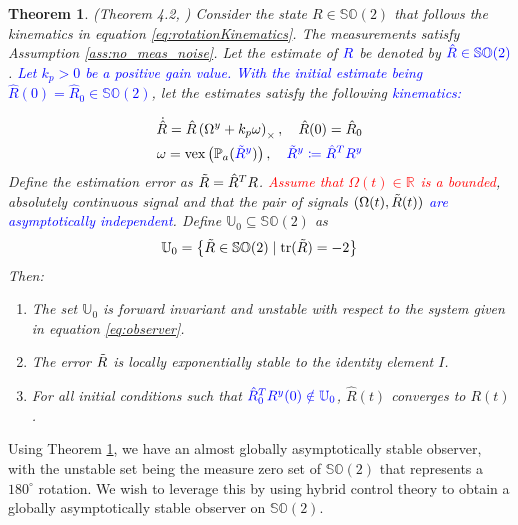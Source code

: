 \documentclass{article}
\newcommand{\SOtwo}{\mathbb{SO}(2)}
\newcommand{\R}[1]{\mathbb{R}^{#1}}
\newcommand{\Omegay}{\Omega^y}
\newcommand{\vex}[1]{\text{vex}\left(#1\right)}
\newtheorem{theorem}{Theorem}
\newcommand{\textblue}[1]{\textcolor{blue}{#1}}
\begin{document}
\begin{theorem} \label{thm:mahony}
(Theorem 4.2, \cite{mahony_complementaryFilter}) Consider the state $R\in\SOtwo$ that follows the kinematics in equation \eqref{eq:rotationKinematics}. The measurements satisfy Assumption \eqref{ass:no_meas_noise}. Let the estimate of $\textcolor{blue}{R}$ be denoted by $\textcolor{blue}{\hat{R}\in\SOtwo}$. \textcolor{blue}{Let $k_p > 0$ be a positive gain value. With the initial estimate being $\hat{R}(0) = \hat{R}_0 \in \SOtwo$}, let the estimates satisfy the following \textcolor{blue}{kinematics:}

\begin{subequations}\label{eq:observer}
\begin{align}
    \dot{\hat{R}} = \hat{R}\left( \Omegay + k_p\omega\right)_\times, \quad \hat{R}(0) = \hat{R}_0 \label{eq:}\\
    \omega = \vex{\mathbb{P}_a(\textcolor{blue}{\Tilde{R}^y})}, \quad \textcolor{blue}{\Tilde{R}^y \coloneqq \hat{R}^TR^y}
\end{align}
\end{subequations}
Define the estimation error as $\Tilde{R} = \hat{R}^TR$. \textcolor{red}{Assume that $\Omega(t)\in \R{}$
is a bounded}, absolutely continuous signal and that the pair of signals \textblue{$(\Omega(t), \Tilde{R}(t))$ are asymptotically independent}. Define $\mathbb{U}_0 \subseteq \SOtwo$ as 
\[\mathbb{U}_0 = \left\{ \Tilde{R}\in \SOtwo \mid \text{tr}(\Tilde{R}) = -2\right\}\]
Then:
\begin{enumerate}
    \item The set $\mathbb{U}_0$ is forward invariant and {unstable} with respect to the system given in equation \eqref{eq:observer}.
    \item {The error $\Tilde{R}$ is locally exponentially stable to the identity element $I$.} 
    \item For all initial conditions such that $\textblue{\hat{R}_0^TR^y(0) \notin \mathbb{U}_0}$, $\hat{R}(t)$ converges to $R(t)$.
\end{enumerate}
\end{theorem}
Using Theorem \ref{thm:mahony}, we have an almost globally asymptotically stable observer, with the unstable set being the measure zero set of $\SOtwo$ that represents a $180^\circ$ rotation. We wish to leverage this by using hybrid control theory to obtain a globally asymptotically stable observer on $\SOtwo$. 
\end{document}
